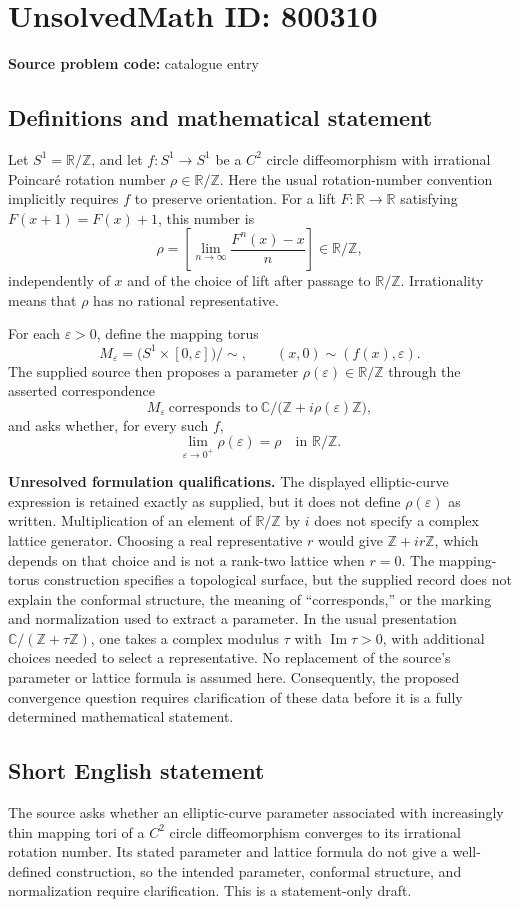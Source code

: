 \documentclass[11pt]{article}
\newcommand{\Z}{\mathbb{Z}}
\newcommand{\R}{\mathbb{R}}
\newcommand{\C}{\mathbb{C}}
\begin{document}
\section*{UnsolvedMath ID: 800310}
\textbf{Source problem code:} catalogue entry
\subsection{Definitions and mathematical statement}
Let \(S^1=\R/\Z\), and let \(f:S^1\to S^1\) be a \(C^2\) circle diffeomorphism with irrational Poincar\'e rotation number \(\rho\in\R/\Z\). Here the usual rotation-number convention implicitly requires \(f\) to preserve orientation. For a lift \(F:\R\to\R\) satisfying \(F(x+1)=F(x)+1\), this number is
\[
\rho=\left[\lim_{n\to\infty}\frac{F^n(x)-x}{n}\right]\in\R/\Z,
\]
independently of \(x\) and of the choice of lift after passage to \(\R/\Z\). Irrationality means that \(\rho\) has no rational representative.

For each \(\varepsilon>0\), define the mapping torus
\[
M_{\varepsilon}=\bigl(S^1\times[0,\varepsilon]\bigr)/\!\sim,
\qquad (x,0)\sim(f(x),\varepsilon).
\]
The supplied source then proposes a parameter \(\rho(\varepsilon)\in\R/\Z\) through the asserted correspondence
\[
M_{\varepsilon}\ \text{corresponds to}\ 
\C/\bigl(\Z+i\rho(\varepsilon)\Z\bigr),
\]
and asks whether, for every such \(f\),
\[
\lim_{\varepsilon\to0^+}\rho(\varepsilon)=\rho
\quad\text{in }\R/\Z.
\]

\textbf{Unresolved formulation qualifications.} The displayed elliptic-curve expression is retained exactly as supplied, but it does not define \(\rho(\varepsilon)\) as written. Multiplication of an element of \(\R/\Z\) by \(i\) does not specify a complex lattice generator. Choosing a real representative \(r\) would give \(\Z+ir\Z\), which depends on that choice and is not a rank-two lattice when \(r=0\). The mapping-torus construction specifies a topological surface, but the supplied record does not explain the conformal structure, the meaning of ``corresponds,'' or the marking and normalization used to extract a parameter. In the usual presentation \(\C/(\Z+\tau\Z)\), one takes a complex modulus \(\tau\) with \(\operatorname{Im}\tau>0\), with additional choices needed to select a representative. No replacement of the source's parameter or lattice formula is assumed here. Consequently, the proposed convergence question requires clarification of these data before it is a fully determined mathematical statement.
\subsection{Short English statement}
The source asks whether an elliptic-curve parameter associated with increasingly thin mapping tori of a \(C^2\) circle diffeomorphism converges to its irrational rotation number. Its stated parameter and lattice formula do not give a well-defined construction, so the intended parameter, conformal structure, and normalization require clarification. This is a statement-only draft.
\end{document}
